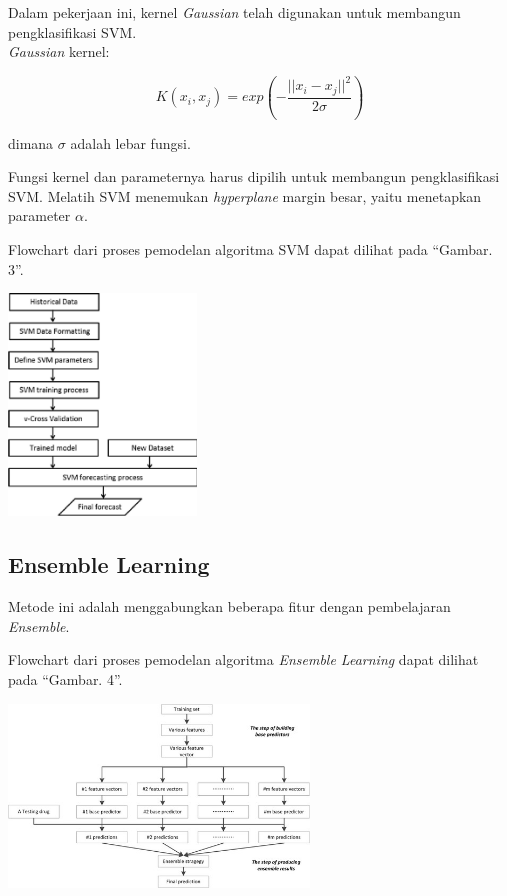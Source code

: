 \documentclass[conference]{IEEEtran}
\begin{document}
Dalam pekerjaan ini, kernel \emph{Gaussian} telah digunakan
untuk membangun pengklasifikasi SVM.\\ \emph{Gaussian} kernel:

\begin{equation*}
K(x_i,x_j) = exp\left (- \frac{||x_i-x_j||^2}{2\sigma} \right )
\label{eq5}
\end{equation*}

\noindent dimana $\sigma$ adalah lebar fungsi.

Fungsi kernel dan parameternya harus dipilih untuk membangun pengklasifikasi SVM. Melatih SVM menemukan \emph{hyperplane} margin besar, yaitu menetapkan parameter $\alpha$.

Flowchart dari proses pemodelan algoritma SVM dapat dilihat pada ``Gambar. 3''\cite{inproceedings}.\vspace{6pt}

\begin{minipage}{\linewidth}
\centerline{\includegraphics[width=50mm]{Gambar/Gbr003.jpg}}
\label{fig3}
\end{minipage}

\subsection{Ensemble Learning}

Metode ini adalah menggabungkan beberapa fitur dengan pembelajaran \emph{Ensemble}.

Flowchart dari proses pemodelan algoritma \emph{Ensemble Learning} dapat dilihat pada ``Gambar. 4''\cite{zhang}.\vspace{6pt}

\begin{minipage}{\linewidth}
\centerline{\includegraphics[width=80mm]{Gambar/Gbr004.png}}
\label{fig4}
\end{minipage}
\end{document}
